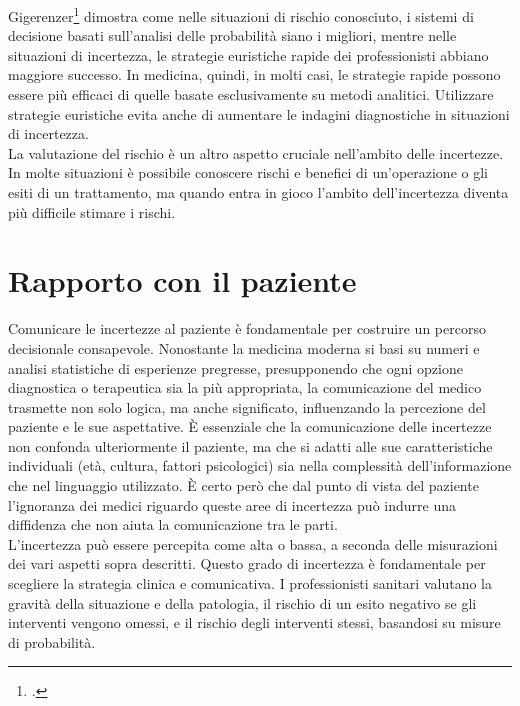 Gigerenzer\footcite{womak:gigerenzer-euristiche} dimostra come nelle situazioni di rischio conosciuto, i sistemi di decisione basati sull'analisi delle probabilità siano i migliori, mentre nelle situazioni di incertezza, le strategie euristiche rapide dei professionisti abbiano maggiore successo. In medicina, quindi, in molti casi, le strategie rapide possono essere più efficaci di quelle basate esclusivamente su metodi analitici. Utilizzare strategie euristiche evita anche di aumentare le indagini diagnostiche in situazioni di incertezza.\\

La valutazione del rischio è un altro aspetto cruciale nell'ambito delle incertezze. In molte situazioni è possibile conoscere rischi e benefici di un'operazione o gli esiti di un trattamento, ma quando entra in gioco l'ambito dell'incertezza diventa più difficile stimare i rischi. \\


\section{Rapporto con il paziente}

Comunicare le incertezze al paziente è fondamentale per costruire un percorso decisionale consapevole. Nonostante la medicina moderna si basi su numeri e analisi statistiche di  esperienze pregresse, presupponendo che ogni opzione diagnostica o terapeutica sia la più appropriata, la comunicazione del medico trasmette non solo logica, ma anche significato, influenzando la percezione del paziente e le sue aspettative. È essenziale che la comunicazione delle incertezze non confonda ulteriormente il paziente, ma che si adatti alle sue caratteristiche individuali (età, cultura, fattori psicologici) sia nella complessità dell'informazione che nel linguaggio utilizzato. È certo però che dal punto di vista del paziente l'ignoranza dei medici riguardo queste aree di incertezza può indurre una diffidenza che non aiuta la comunicazione tra le parti. \\
L'incertezza può essere percepita come alta o bassa, a seconda delle misurazioni dei vari aspetti sopra descritti. Questo grado di incertezza è fondamentale per scegliere la strategia clinica e comunicativa. I professionisti sanitari valutano la gravità della situazione e della patologia, il rischio di un esito negativo se gli interventi vengono omessi, e il rischio degli interventi stessi, basandosi su misure di probabilità.\\

